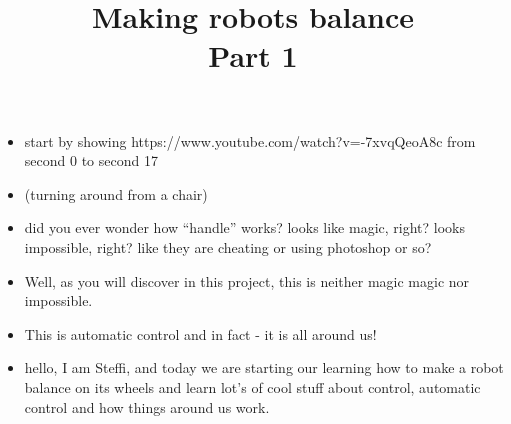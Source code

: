 \newif	\ifexternalize					%
\newif	\ifshowonlynotes				%
\newif	\ifhandout						%
\newif	\ifshowsolutions				%
\newif	\ifshownotes					%
\ifdefined\EXTERNALIZE	\externalizetrue	\fi						%
\ifdefined\ONLYNOTES	\showonlynotestrue	\fi						%
\ifdefined\HANDOUT		\handouttrue		\fi						%
\ifdefined\SOLUTIONS	\showsolutionstrue	\fi						%
\ifdefined\NOTES		\shownotestrue		\fi						%
\title		[Balancing Robots]	{Making robots balance \\ Part 1}	%
\date		{} %


\begin{frame}
	\begin{itemize}
		\item start by showing https://www.youtube.com/watch?v=-7xvqQeoA8c from second 0 to second 17
	\end{itemize}
\end{frame}


\begin{frame}
	\begin{itemize}
		\item (turning around from a chair)
		\item did you ever wonder how ``handle'' works? looks like magic, right? looks impossible, right? like they are cheating or using photoshop or so?
		\item Well, as you will discover in this project, this is neither magic magic nor impossible.
		\item This is automatic control and in fact - it is all around us!
		\item hello, I am Steffi, and today we are starting our learning how to make a robot balance on its wheels and learn lot's of cool stuff about control, automatic control and how things around us work.
	\end{itemize}
\end{frame}


